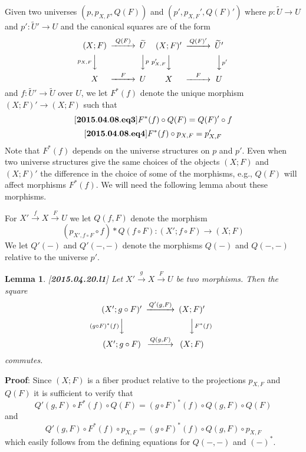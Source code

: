 \documentclass[12pt]{article}
\newenvironment{eq}{\begin{equation}}{\end{equation}}
\newenvironment{myproof}{{\bf Proof}:}{\vskip 5mm }
\newtheorem{lemma}[proposition]{Lemma}
\newcommand{\llabel}[1]{\label{#1}[{\bf #1}]}
\newcommand{\sr}{\rightarrow}
\newcommand{\wt}{\widetilde}
\newcommand{\spc}{{\,\,\,\,\,\,\,}}
\begin{document}
Given two universes $(p,p_{X,F},Q(F))$ and $(p',p_{X,F}',Q(F)')$ where $p:\wt{U}\sr U$ and $p':\wt{U}'\sr U$ and the canonical squares are of the form
%
$$
\begin{CD}
(X;F) @>Q(F)>> \wt{U}\\
@Vp_{X,F} VV @VVp V\\
X @>F>> U
\end{CD}
\spc
\begin{CD}
(X;F)' @>Q(F)'>> \wt{U}'\\
@Vp_{X,F}' VV @VVp' V\\
X @>F>> U
\end{CD}
$$
%
and $f:\wt{U}'\sr \wt{U}$ over $U$, we let $F^*(f)$ denote the unique morphism $(X;F)'\sr (X;F)$ such that 
%
\begin{eq}\llabel{2015.04.08.eq3}
F^*(f)\circ Q(F)=Q(F)'\circ f
\end{eq}
%
\begin{eq}\llabel{2015.04.08.eq4}
F^*(f)\circ p_{X,F}=p_{X,F}'
\end{eq}
%
Note that $F^*(f)$ depends on the universe structures on $p$ and $p'$. Even when two universe structures give the same choices of the objects $(X;F)$ and $(X;F)'$ the difference in the choice of some of the morphisms, e.g., $Q(F)$ will affect morphisms $F^*(f)$. We will need the following lemma about these morphisms. 

For $X'\stackrel{f}{\sr}X \stackrel{F}{\sr}U$ we let $Q(f,F)$ denote the morphism
%
$$(p_{X',f\circ F}\circ f)*Q(f\circ F):(X';f\circ F)\sr (X;F)$$
%
We let $Q'(-)$ and $Q'(-,-)$ denote the morphisms $Q(-)$ and $Q(-,-)$ relative to the universe $p'$.
%
\begin{lemma}
\llabel{2015.04.20.l1}
Let $X'\stackrel{g}{\sr}X\stackrel{F}{\sr}U$ be two morphisms. Then the square
%
$$
\begin{CD}
(X';g\circ F)' @>Q'(g,F)>> (X;F)'\\
@V(g\circ F)^*(f)VV @VVF^*(f) V\\
(X';g\circ F) @>Q(g,F)>> (X;F)
\end{CD}
$$
%
commutes.
%
\end{lemma}
%
\begin{myproof}
Since $(X;F)$ is a fiber product relative to the projections $p_{X,F}$ and $Q(F)$ it is sufficient to verify that
%
$$Q'(g,F)\circ F^*(f)\circ Q(F)=(g\circ F)^*(f) \circ Q(g,F)\circ Q(F)$$
%
and
%
$$Q'(g,F)\circ F^*(f)\circ p_{X,F}=(g\circ F)^*(f) \circ Q(g,F)\circ p_{X,F}$$
%
which easily follows from the defining equations for $Q(-,-)$ and $(-)^*$.
\end{myproof}
\end{document}
